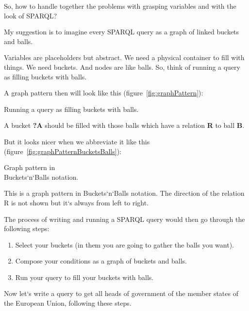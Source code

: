 So, how to handle together the problems with grasping variables and with the look of SPARQL?

My suggestion is to imagine every SPARQL query as a graph of linked buckets and balls.

Variables are placeholders but abstract. We need a physical container to fill with things. We need buckets. And nodes are like balls. So, think of running a query as filling buckets with balls.

A graph pattern then will look like this (figure~\ref{fig:graphPattern}):

\begin{marginfigure}[-1.5cm]
	{
		\setlength{\fboxsep}{0pt}%
		\setlength{\fboxrule}{1pt}%
	}
    \caption{Running a query as filling buckets with balls.}
	\label{fig:graphPattern}
\end{marginfigure}

A bucket \textbf{?A} should be filled with those balls which have a relation \textbf{R} to ball \textbf{B}.

But it looks nicer when we abbreviate it like this (figure~\ref{fig:graphPatternBucketsBalls}):

\begin{marginfigure}[1.0cm]
	{
		\setlength{\fboxsep}{0pt}%
		\setlength{\fboxrule}{1pt}%
	}
    \caption{Graph pattern in\\ Buckets`n`Balls notation.}
	\label{fig:graphPatternBucketsBalls}
\end{marginfigure}

This is a graph pattern in Buckets`n`Balls notation. The direction of the relation R is not shown but it`s always from left to right.

The process of writing and running a SPARQL query would then go through the following steps:

\begin{enumerate}
    \item Select your buckets (in them you are going to gather the balls you want).
    \item Compose your conditions as a graph of buckets and balls.
    \item Run your query to fill your buckets with balls.
\end{enumerate}

Now let`s write a query to get all heads of government of the member states of the European Union, following these steps.

